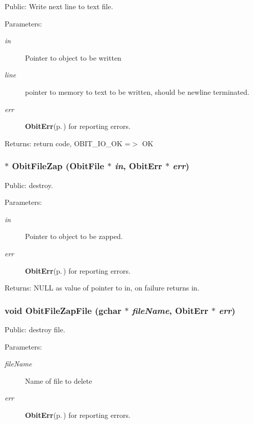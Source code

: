 Public: Write next line to text file. 

\begin{Desc}
\item[Parameters:]
\begin{description}
\item[{\em in}]Pointer to object to be written \item[{\em line}]pointer to memory to text to be written, should be newline terminated. \item[{\em err}]{\bf Obit\-Err}{\rm (p.\,\pageref{structObitErr})} for reporting errors. \end{description}
\end{Desc}
\begin{Desc}
\item[Returns:]return code, OBIT\_\-IO\_\-OK =$>$ OK \end{Desc}
\subsubsection{$\ast$ Obit\-File\-Zap ({\bf Obit\-File} $\ast$ {\em in}, {\bf Obit\-Err} $\ast$ {\em err})}\label{ObitFile_8h_a25}


Public: destroy. 

\begin{Desc}
\item[Parameters:]
\begin{description}
\item[{\em in}]Pointer to object to be zapped. \item[{\em err}]{\bf Obit\-Err}{\rm (p.\,\pageref{structObitErr})} for reporting errors. \end{description}
\end{Desc}
\begin{Desc}
\item[Returns:]NULL as value of pointer to in, on failure returns in. \end{Desc}
\subsubsection{\setlength{\rightskip}{0pt plus 5cm}void Obit\-File\-Zap\-File (gchar $\ast$ {\em file\-Name}, {\bf Obit\-Err} $\ast$ {\em err})}\label{ObitFile_8h_a26}


Public: destroy file. 

\begin{Desc}
\item[Parameters:]
\begin{description}
\item[{\em file\-Name}]Name of file to delete \item[{\em err}]{\bf Obit\-Err}{\rm (p.\,\pageref{structObitErr})} for reporting errors. \end{description}
\end{Desc}
